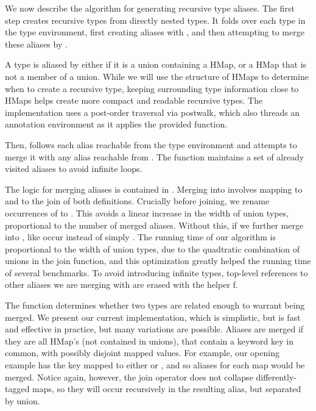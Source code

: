 We now describe the algorithm for generating recursive type aliases.
The first step \squashlocal{} creates recursive types from directly nested types.
It folds over each type in the type environment, first
creating aliases with \aliashmap{}, and then
attempting to merge these aliases by \squashall{}.

A type is aliased by \aliashmap{} either if it is a union containing a HMap,
or a HMap that is not a member of a union.
While we will use the structure of HMaps to determine when to create a recursive
type, keeping surrounding type information close to HMaps helps create more
compact and readable recursive types.
The implementation uses a post-order traversal via \textsf{postwalk},
which also threads an annotation environment as it applies
the provided function.

Then, \squashall{} follows each alias  reachable from the type environment
and attempts to merge it with any alias reachable from .
The \squash{} function maintains 
a set of already visited aliases to avoid infinite loops.

The logic for merging aliases is contained in \mergealiases{}.
Merging  into  involves mapping 
to  and  to the join of both definitions.
Crucially before joining, we rename occurrences of 
 to . This avoids a linear increase in the
width of union types, proportional to the number of merged aliases.
Without this, if we further merge  into ,
like  occur
instead of simply .
The running time of our algorithm is proportional to the
width of union types, due to the quadtratic combination of
unions in the join function, and this optimization greatly
helped the running time of several benchmarks.
To avoid introducing infinite types,
top-level references to other aliases we are merging with
are erased with the helper \textsf{f}.

The \shouldmergeOp{} function determines whether two types are related enough
to warrant being merged. We present our current implementation, which is simplistic,
but is fast and effective in practice, but many variations are possible.
Aliases are merged if they are all HMap's (not contained in unions), that
contain a keyword key in common, with possibly disjoint mapped values.
For example, our opening example has the  key mapped to either
 or , and so aliases for each map would be merged.
Notice again, however, the join operator does not collapse differently-tagged
maps, so they will occur recursively in the resulting alias, but separated by union.


